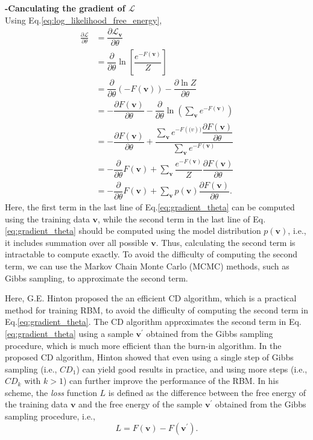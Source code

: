 \documentclass[10pt, a4paper]{article}
\begin{document}
\noindent\textbf{-Canculating the gradient of $\mathcal{L}$}\\
\noindent Using Eq.\eqref{eq:log_likelihood_free_energy},
\begin{align}
  \frac{\partial \mathcal{L}}{\partial \theta} 
  &= \dfrac{\partial \mathcal{L}_{\mathbf{v}}}{\partial \theta} \nonumber \\
  &= \dfrac{\partial}{\partial \theta} 
      \ln \left[\dfrac{e^{-F(\mathbf{v})}}{Z}\right] \nonumber \\
  &= \dfrac{\partial}{\partial \theta} \left(-F(\mathbf{v})\right)
      - \dfrac{\partial \ln Z}{\partial \theta} \nonumber \\
  &= -\dfrac{\partial F(\mathbf{v})}{\partial \theta}
      - \dfrac{\partial}{\partial \theta} \ln \left(\sum_{\mathbf{v}} 
      e^{-F(\mathbf{v})}\right) \nonumber\\
  &= -\dfrac{\partial F(\mathbf{v})}{\partial \theta} 
      + \dfrac{\sum_{\mathbf{v}}e^{-F(\mathbf(v))}
      \dfrac{\partial F(\mathbf{v})}{\partial \theta}}
      {\sum_{\mathbf{v}} e^{-F(\mathbf{v})}} \nonumber \\
  &= -\dfrac{\partial}{\partial\theta}F(\mathbf{v})
      +\sum_{\mathbf{v}} \dfrac{e^{-F(\mathbf{v})}}{Z}
      \dfrac{\partial F(\mathbf{v})}{\partial \theta} \nonumber \\
  &= -\dfrac{\partial}{\partial\theta}F(\mathbf{v})
      +\sum_{\mathbf{v}} p(\mathbf{v}) 
      \dfrac{\partial F(\mathbf{v})}{\partial \theta}.
  \label{eq:gradient_theta}
\end{align}
Here, the first term in the last line of Eq.\eqref{eq:gradient_theta} 
can be computed using the training data $\mathbf{v}$,
while the second term in the last line of Eq.\eqref{eq:gradient_theta}
should be computed using the model distribution $p(\mathbf{v})$, i.e.,
it includes summation over all possible $\mathbf{v}$.
Thus, calculating the second term is intractable to compute exactly.
To avoid the difficulty of computing the second term,
we can use the Markov Chain Monte Carlo (MCMC) methods, such as Gibbs sampling,
to approximate the second term.

Here, G.E. Hinton proposed the an efficient CD algorithm, 
which is a practical method for training RBM,
to avoid the difficulty of computing the second term in Eq.\eqref{eq:gradient_theta}.
The CD algorithm approximates the second term in Eq.\eqref{eq:gradient_theta}
using a sample $\mathbf{v}^\prime$ obtained from the Gibbs sampling procedure,
which is much more efficient than the burn-in algorithm.
In the proposed CD algorithm, Hinton showed that even using a single step of Gibbs sampling 
(i.e., $CD_1$) can yield good results in practice,
and using more steps (i.e., $CD_k$ with $k>1$) can further 
improve the performance of the RBM.
In his scheme, the {\it loss} function $L$ is defined as the difference
between the free energy of the training data $\mathbf{v}$
and the free energy of the sample $\mathbf{v}^\prime$ obtained
from the Gibbs sampling procedure, i.e.,
\begin{equation}
L=F(\mathbf{v})-F(\mathbf{v}^\prime).
\label{eq:loss_Hinton}
\end{equation}
\end{document}
